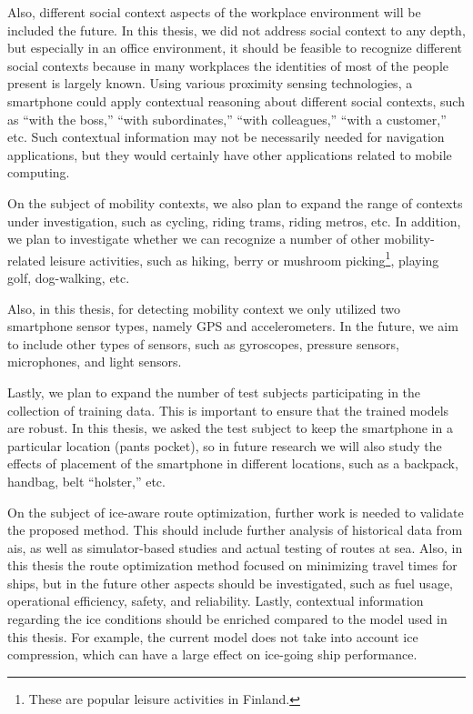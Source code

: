 Also, different social context aspects of the workplace environment will be included the future. In this thesis, we did not address social context to any depth, but especially in an office environment, it should be feasible to recognize different social contexts because in many workplaces the identities of most of the people present is largely known. Using various proximity sensing technologies, a smartphone could apply contextual reasoning about different social contexts, such as ``with the boss,'' ``with subordinates,'' ``with colleagues,'' ``with a customer,'' etc. Such contextual information may not be necessarily needed for navigation applications, but they would certainly have other applications related to mobile computing.

On the subject of mobility contexts, we also plan to expand the range of contexts under investigation, such as cycling, riding trams, riding metros, etc. In addition, we plan to investigate whether we can recognize a number of other mobility-related leisure activities, such as hiking, berry or mushroom picking\footnote{These are popular leisure activities in Finland.}, playing golf, dog-walking, etc.

Also, in this thesis, for detecting mobility context we only utilized two smartphone sensor types, namely GPS and accelerometers. In the future, we aim to include other types of sensors, such as gyroscopes, pressure sensors, microphones, and light sensors.

Lastly, we plan to expand the number of test subjects participating in the collection of training data. This is important to ensure that the trained models are robust. In this thesis, we asked the test subject to keep the smartphone in a particular location (pants pocket), so in future research we will also study the effects of placement of the smartphone in different locations, such as a backpack, handbag, belt ``holster,'' etc.

On the subject of ice-aware route optimization, further work is needed to validate the proposed method. This should include further analysis of historical data from \gls{ais}, as well as simulator-based studies and actual testing of routes at sea. Also, in this thesis the route optimization method focused on minimizing travel times for ships, but in the future other aspects should be investigated, such as fuel usage, operational efficiency, safety, and reliability. Lastly, contextual information regarding the ice conditions should be enriched compared to the model used in this thesis. For example, the current model does not take into account ice compression, which can have a large effect on ice-going ship performance.
%
